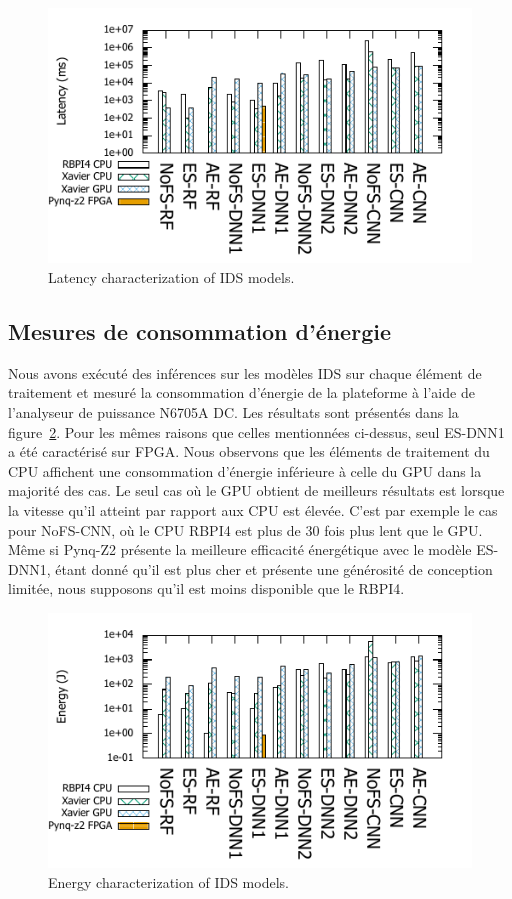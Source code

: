 \begin{figure}
    \centering
    \includegraphics[width=0.9\columnwidth]{6_Chapitre4/figures/latency_bar.pdf}
    \caption{Latency characterization of IDS models.}
    \label{figure:herocache-performance}
\end{figure}

\subsection{Mesures de consommation d'énergie}

Nous avons exécuté des inférences sur les modèles IDS sur chaque élément de traitement et mesuré la consommation d'énergie de la plateforme à l'aide de l'analyseur de puissance N6705A DC. Les résultats sont présentés dans la figure~\ref{figure:herocache-energy}. Pour les mêmes raisons que celles mentionnées ci-dessus, seul ES-DNN1 a été caractérisé sur FPGA. Nous observons que les éléments de traitement du CPU affichent une consommation d'énergie inférieure à celle du GPU dans la majorité des cas. Le seul cas où le GPU obtient de meilleurs résultats est lorsque la vitesse qu'il atteint par rapport aux CPU est élevée. C'est par exemple le cas pour NoFS-CNN, où le CPU RBPI4 est plus de 30 fois plus lent que le GPU. Même si Pynq-Z2 présente la meilleure efficacité énergétique avec le modèle ES-DNN1, étant donné qu'il est plus cher et présente une générosité de conception limitée, nous supposons qu'il est moins disponible que le RBPI4.

\begin{figure}
    \centering
    \includegraphics[width=0.9\columnwidth]{6_Chapitre4/figures/energy_bar.pdf}
    \caption{Energy characterization of IDS models.}
    \label{figure:herocache-energy}
\end{figure}


